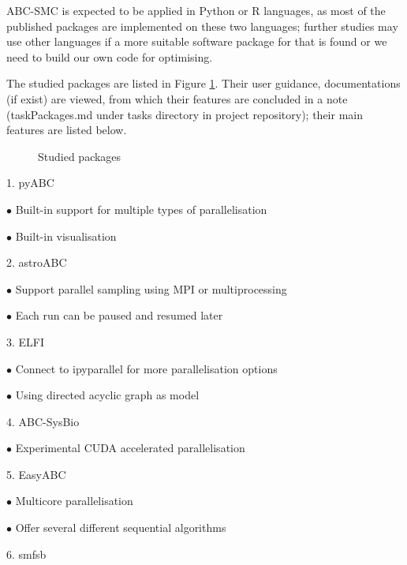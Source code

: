 \documentclass{article}
\begin{document}
ABC-SMC is expected to be applied in Python or R languages, as most of the published packages are implemented on these two languages; further studies may use other languages if a more suitable software package for that is found or we need to build our own code for optimising.

The studied packages are listed in Figure \ref{fig:2}. Their user guidance, 
documentations (if exist) are viewed, from which their features are concluded 
in a note (taskPackages.md under tasks directory in project repository);
their main features are listed below. 

\begin{figure}

	\begin{center}
	\end{center}
	
	\caption{Studied packages}
	\label{fig:2}
	
	\end{figure}


1. pyABC

\quad $\bullet$ Built-in support for multiple types of  parallelisation

\quad $\bullet$ Built-in visualisation

2. astroABC

\quad $\bullet$ Support parallel sampling using MPI or multiprocessing

\quad $\bullet$ Each run can be paused and resumed later

3. ELFI

\quad $\bullet$ Connect to ipyparallel for more parallelisation options

\quad $\bullet$ Using directed acyclic graph as model

4. ABC-SysBio

\quad $\bullet$ Experimental CUDA accelerated parallelisation

5. EasyABC

\quad $\bullet$ Multicore parallelisation

\quad $\bullet$ Offer several different sequential algorithms

6. smfsb
\end{document}

